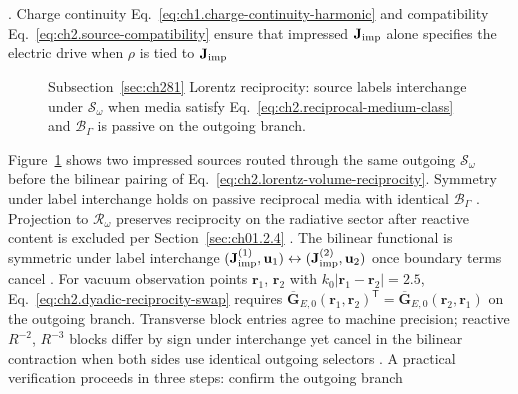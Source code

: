 \cite{stratton1941,harrington2001,collin2001}.
Charge continuity Eq.~\eqref{eq:ch1.charge-continuity-harmonic} and
compatibility Eq.~\eqref{eq:ch2.source-compatibility} ensure that impressed \(\mathbf{J}_{\mathrm{imp}}\) alone
specifies the electric drive when \(\rho\) is tied to \(\mathbf{J}_{\mathrm{imp}}\)
\begin{figure}[t]
\centering
{}
\caption{Subsection~\ref{sec:ch281} Lorentz reciprocity: source labels interchange under
\(\mathcal{S}_\omega\) when media satisfy Eq.~\eqref{eq:ch2.reciprocal-medium-class} and
\(\mathcal{B}_\Gamma\) is passive on the outgoing branch.}
\label{fig:ch2.lorentz-reciprocity-measurement chain}
\end{figure}
Figure~\ref{fig:ch2.lorentz-reciprocity-measurement chain} shows two impressed sources routed
through the same outgoing $\mathcal{S}_\omega$ before the bilinear pairing of
Eq.~\eqref{eq:ch2.lorentz-volume-reciprocity}. Symmetry under label interchange holds on passive
reciprocal media with identical $\mathcal{B}_\Gamma$ \cite{stratton1941}. Projection to
$\mathcal{R}_\omega$ preserves reciprocity on the radiative sector after reactive content is
excluded per Section~\ref{sec:ch01.2.4} \cite{harrington2001}. The bilinear functional is symmetric under
label interchange $(\mathbf{J}_{\mathrm{imp}}^{(1)},\mathbf{u}_1)\leftrightarrow(\mathbf{J}_{\mathrm{imp}}^{(2)},\mathbf{u}_2)$ once
boundary terms cancel \cite{stratton1941}.
For vacuum observation points $\mathbf{r}_1$, $\mathbf{r}_2$ with $k_0|\mathbf{r}_1-\mathbf{r}_2|=2.5$, Eq.~\eqref{eq:ch2.dyadic-reciprocity-swap} requires $\overline{\mathbf{G}}_{E,0}(\mathbf{r}_1,\mathbf{r}_2)^{\mathsf{T}}=\overline{\mathbf{G}}_{E,0}(\mathbf{r}_2,\mathbf{r}_1)$ on the outgoing branch. Transverse block entries agree to machine precision; reactive $R^{-2}$, $R^{-3}$ blocks differ by sign under interchange yet cancel in the bilinear contraction when both sides use identical outgoing selectors \cite{stratton1941}. A practical verification proceeds in three steps: confirm the outgoing branch
